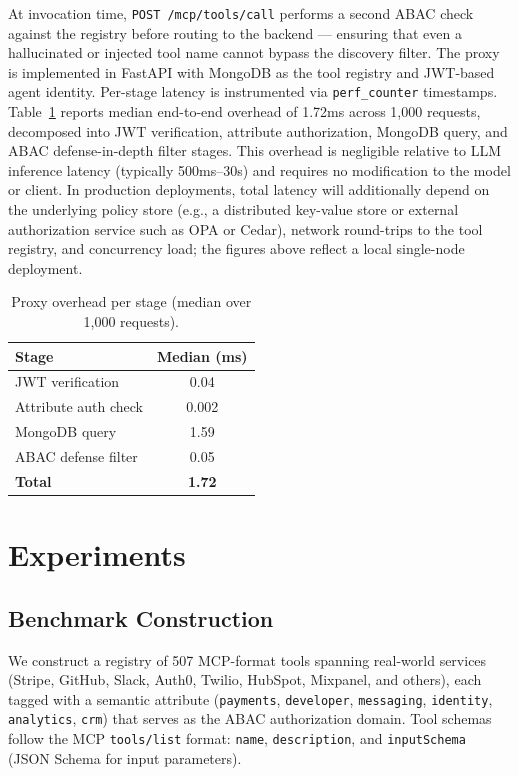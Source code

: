 \documentclass[11pt]{article}
\begin{document}
At invocation time, \texttt{POST /mcp/tools/call} performs
a second ABAC check against the registry before routing
to the backend --- ensuring that even a hallucinated or
injected tool name cannot bypass the discovery filter.
The proxy is implemented in FastAPI with MongoDB as the
tool registry and JWT-based agent identity. Per-stage
latency is instrumented via \texttt{perf\_counter}
timestamps. Table~\ref{tab:latency} reports median
end-to-end overhead of 1.72ms across 1{,}000 requests,
decomposed into JWT verification, attribute authorization,
MongoDB query, and ABAC defense-in-depth filter stages.
This overhead is negligible relative to LLM inference
latency (typically 500ms--30s) and requires no modification
to the model or client. In production deployments, total
latency will additionally depend on the underlying policy
store (e.g., a distributed key-value store or external
authorization service such as OPA or Cedar), network
round-trips to the tool registry, and concurrency load;
the figures above reflect a local single-node deployment.

\begin{table}[h]
\centering
\small
\begin{tabular}{lc}
\toprule
\textbf{Stage} & \textbf{Median (ms)} \\
\midrule
JWT verification     & 0.04 \\
Attribute auth check & 0.002 \\
MongoDB query        & 1.59 \\
ABAC defense filter  & 0.05 \\
\midrule
\textbf{Total}       & \textbf{1.72} \\
\bottomrule
\end{tabular}
\caption{Proxy overhead per stage (median over 1,000 requests).}
\label{tab:latency}
\end{table}


\section{Experiments}

\subsection{Benchmark Construction}
We construct a registry of 507 MCP-format tools spanning
real-world services (Stripe, GitHub, Slack, Auth0, Twilio,
HubSpot, Mixpanel, and others), each tagged with a semantic
attribute (\texttt{payments}, \texttt{developer},
\texttt{messaging}, \texttt{identity}, \texttt{analytics},
\texttt{crm}) that serves as the ABAC authorization domain.
Tool schemas follow the MCP \texttt{tools/list} format:
\texttt{name}, \texttt{description}, and \texttt{inputSchema}
(JSON Schema for input parameters).
\end{document}
